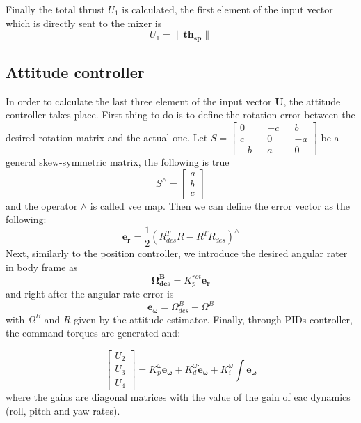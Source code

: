 \noindent
Finally the total thrust $U_1$ is calculated, the first element of the input vector which is directly sent to the mixer is
\begin{equation}
	U_1 =  {\lVert\boldsymbol{th_{sp}}\rVert}
\end{equation}



\subsection{Attitude controller}
\label{sec:attcontrol}
In order to calculate the last three element of the input vector $\boldsymbol{U}$, the attitude controller takes place. First thing to do is to define the rotation error between the desired rotation matrix and the actual one. Let $S = \begin{bmatrix}
0  && -c && b  \\
c  && 0  && -a \\
-b && a  && 0 
\end{bmatrix}$ be a general skew-symmetric matrix, the following is true
\begin{equation}
	S^{\wedge} = \begin{bmatrix}a\\b\\c\end{bmatrix}
\end{equation}
and the operator $\wedge$ is called vee map. Then we can define the error vector as the following:
\begin{equation}
	\boldsymbol{e_r} = \frac{1}{2} (R^T_{des} R - R^TR_{des} )^\wedge
\end{equation}
Next, similarly to the position controller, we introduce the desired angular rater in body frame as
\begin{equation}
	\boldsymbol{\Omega^B_{des}} = K_p^{rot} \boldsymbol{e_r} 
\end{equation}
and right after the angular rate error is 
\begin{equation}
	\boldsymbol{e_\omega} = \Omega^B_{des} - \Omega^B
\end{equation}
with $\Omega^B$ and $R$ given by the attitude estimator.
Finally, through PIDs controller, the command torques are generated and:

\begin{equation}
	\begin{bmatrix}
	U_2\\U_3\\U_4
	\end{bmatrix} =  K_p^{\omega}  \boldsymbol{e_\omega} + K_d^{\omega} { \boldsymbol{\dot{e}_\omega}} + K_i^{\omega} \int \boldsymbol{e_\omega}
\end{equation}
where the gains are diagonal matrices with the value of the gain of eac dynamics (roll, pitch and yaw rates).


